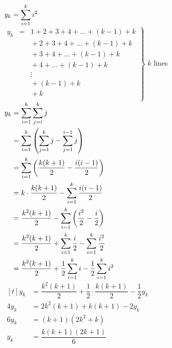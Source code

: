 \documentclass[letterpaper,fleqn,leqno]{article}
\begin{document}
{{{				$y_k=\displaystyle\sum\limits_{i=1}^{k}i^2$ \\
				$\left.\begin{aligned}
					y_k & {}={} & 1+2+3+4+\dots+(k-1)+k \\
					& & {}+2+3+4+\dots+(k-1)+k \\
					& & {}+3+4+\dots+(k-1)+k \\
					& & {}+4+\dots+(k-1)+k \\
					& & \vdots \\
					& & {}+(k-1)+k \\
					& & {}+k \\
				\end{aligned}\right\}$ $k$ lines \\
				$\begin{aligned}[t]
					y_k &= \displaystyle\sum\limits_{i=1}^{k}\displaystyle\sum\limits_{j=i}^{k}j \\
					&= \displaystyle\sum\limits_{i=1}^{k}\left(\displaystyle\sum\limits_{j=1}^{k}j-\displaystyle\sum\limits_{j=1}^{i-1}j\right) \\
					&= \displaystyle\sum\limits_{i=1}^{k}\left(\dfrac{k(k+1)}{2}-\dfrac{i(i-1)}{2}\right) \\
					&= k\cdot\dfrac{k(k+1)}{2}-\displaystyle\sum\limits_{i=1}^{k}\dfrac{i(i-1)}{2} \\
					&= \dfrac{k^2(k+1)}{2}-\displaystyle\sum\limits_{i=1}^{k}\left(\dfrac{i^2}{2}-\dfrac{i}{2}\right) \\
					&= \dfrac{k^2(k+1)}{2}+\displaystyle\sum\limits_{i=1}^{k}\dfrac{i}{2}-\displaystyle\sum\limits_{i=1}^{k}\dfrac{i^2}{2} \\
					&= \dfrac{k^2(k+1)}{2}+\dfrac{1}{2}\displaystyle\sum\limits_{i=1}^{k}i-\dfrac{1}{2}\displaystyle\sum\limits_{i=1}^{k}i^2 \\
				\end{aligned}$ \\
				$\begin{aligned}[t]
					y_k &= \dfrac{k^2(k+1)}{2}+\dfrac{1}{2}\cdot\dfrac{k(k+1)}{2}-\dfrac{1}{2}y_k \\
					4y_k &= 2k^2(k+1)+k(k+1)-2y_k \\
					6y_k &= (k+1)(2k^2+k) \\
					y_k &= \dfrac{k(k+1)(2k+1)}{6} \\
				\end{aligned}$
			}
		}
	}
\end{document}

